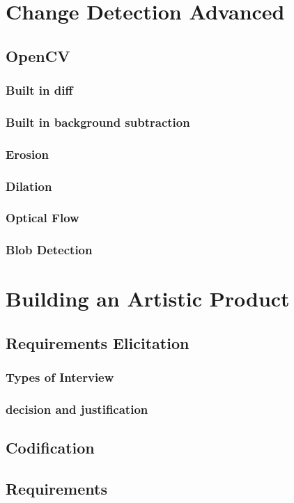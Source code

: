 \documentclass[a4paper]{report}
\begin{document}
\chapter{Change Detection Advanced}
\section{OpenCV}
\subsection{Built in diff}
\subsection{Built in background subtraction}
\subsection{Erosion}
\subsection{Dilation}
\subsection{Optical Flow}
\subsection{Blob Detection}

\chapter{Building an Artistic Product}
\section{Requirements Elicitation}
\subsection{Types of Interview}
\subsection{decision and justification}
\section{Codification}
\section{Requirements}
\end{document}
